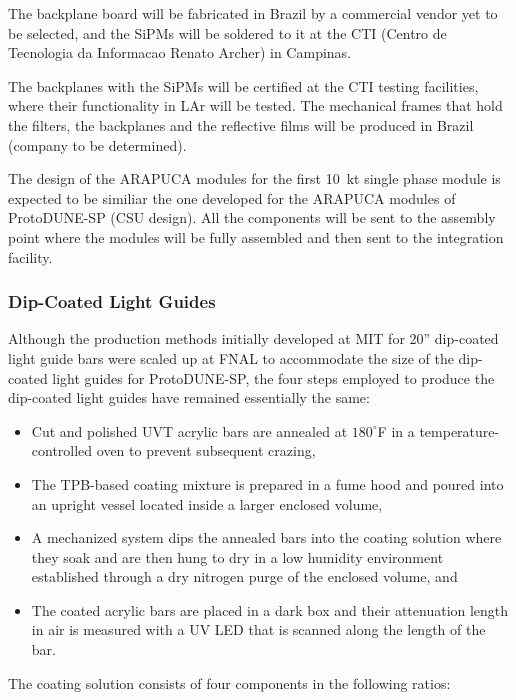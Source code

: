 The backplane board will be fabricated in Brazil by a commercial vendor yet to be selected, and the SiPMs will be soldered to it at the CTI (Centro de Tecnologia da Informacao Renato Archer) in Campinas.  

The backplanes with the SiPMs will be certified at the CTI testing facilities, where their functionality in LAr will be tested.   The mechanical frames that hold the filters, the backplanes and the reflective films will be produced in Brazil (company to be determined).   

The design of the ARAPUCA modules for the first 10~kt single phase module is expected to be similiar the one developed for the ARAPUCA modules of ProtoDUNE-SP (CSU design).   All the components will be sent to the assembly point where the modules will be fully assembled and then sent to the integration facility.



\subsubsection{Dip-Coated Light Guides}
\label{ssec:fdsp-pd-pc-prod-bar1}

Although the production methods initially developed at MIT for 20'' dip-coated light guide bars were scaled up at FNAL to accommodate the size of the dip-coated light guides for ProtoDUNE-SP, the four steps employed to produce the dip-coated light guides have remained essentially the same:

\begin{itemize}
\item Cut and polished UVT acrylic bars are annealed at $180^{\circ}$F in a temperature-controlled oven to prevent subsequent crazing,
\item The TPB-based coating mixture is prepared in a fume hood and poured into an upright vessel located inside a larger enclosed volume,
\item A mechanized system dips the annealed bars into the coating solution where they soak and are then hung to dry in a low humidity environment established through a dry nitrogen purge of the enclosed volume, and
\item The coated acrylic bars are placed in a dark box and their attenuation length in air is measured with a UV LED that is scanned along the length of the bar.
\end{itemize}

The coating solution consists of four components in the following ratios:


